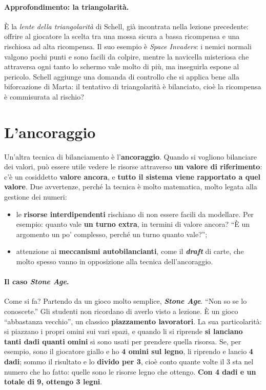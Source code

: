 \paragraph{Approfondimento: la triangolarità.} È la \emph{lente della triangolarità} di
Schell, già incontrata nella lezione precedente: offrire al giocatore la scelta tra una mossa
sicura a bassa ricompensa e una rischiosa ad alta ricompensa. Il suo esempio è \emph{Space
Invaders}: i nemici normali valgono pochi punti e sono facili da colpire, mentre la navicella
misteriosa che attraversa ogni tanto lo schermo vale molto di più, ma inseguirla espone al
pericolo. Schell aggiunge una domanda di controllo che si applica bene alla biforcazione di
Marta: il tentativo di triangolarità è bilanciato, cioè la ricompensa è commisurata al
rischio?

\section{L'ancoraggio}
\label{a14:sec:ancoraggio}



Un'altra tecnica di bilanciamento è l'\textbf{ancoraggio}. Quando si vogliono bilanciare dei
valori, può essere utile vedere le risorse attraverso \textbf{un valore di riferimento}: c'è un
cosiddetto \textbf{valore ancora}, e \textbf{tutto il sistema viene rapportato a quel
valore}. Due avvertenze, perché la tecnica è molto matematica, molto legata alla gestione dei
numeri:
\begin{itemize}
  \item le \textbf{risorse interdipendenti} rischiano di non essere facili da modellare. Per
        esempio: quanto vale \textbf{un turno extra}, in termini di valore ancora? ``È un
        argomento un po' complesso, perché un turno quanto vale?'';
  \item attenzione ai \textbf{meccanismi autobilancianti}, come il \textbf{\emph{draft}} di
        carte, che molto spesso vanno in opposizione alla tecnica dell'ancoraggio.
\end{itemize}

\paragraph{Il caso \emph{Stone Age}.} Come si fa? Partendo da un gioco molto semplice,
\textbf{\emph{Stone Age}}. ``Non so se lo conoscete.'' Gli studenti non ricordano di averlo
visto a lezione. È un gioco ``abbastanza vecchio'', un classico \textbf{piazzamento
lavoratori}. La sua particolarità: si piazzano i propri omini sui vari spazi, e quando li si
riprende \textbf{si lanciano tanti dadi quanti omini} si sono usati per prendere quella risorsa.
Se, per esempio, sono il giocatore giallo e ho \textbf{4 omini sul legno}, li riprendo e lancio
\textbf{4 dadi}; sommo il risultato e lo \textbf{divido per 3}, cioè conto quante volte il 3 sta
nel numero che ho fatto: quelle sono le risorse legno che ottengo. \textbf{Con 4 dadi e un
totale di 9, ottengo 3 legni}.

